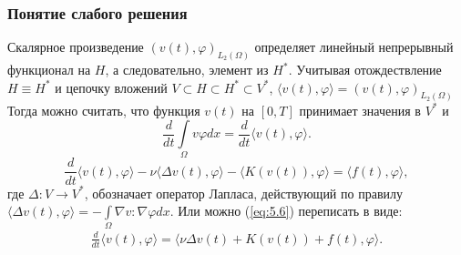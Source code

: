 \documentclass[10pt, pdf, hyperref={unicode}]{beamer}
\begin{document}
  \begin{frame}
    \frametitle{Понятие слабого решения}
    \begin{center}
      \begin{minipage}[h]{0.97\linewidth}
      Скалярное произведение $(v(t), \varphi)_{L_2(\Omega)}$ определяет линейный непрерывный функционал на $H$, а следовательно,
      элемент из $H^\ast$. Учитывая отождествление $H \equiv H^\ast$ и цепочку вложений $V \subset H \subset H^\ast \subset V^\ast$,
      $\langle v(t),\varphi \rangle = (v(t),\varphi)_{L_2(\Omega)}$
      Тогда можно считать, что функция $v(t)$ на $[0, T]$ принимает значения в $V^\ast$ и
      $$\frac{d}{dt}\int\limits_\Omega v \varphi dx=\frac{d}{dt}\langle v(t),\varphi \rangle.$$
      $$\frac{d}{dt} \langle v(t),\varphi \rangle - \nu\langle \Delta v(t), \varphi \rangle -
      \langle K(v(t)),\varphi \rangle = \langle f(t),\varphi \rangle,$$
      где $\Delta: V \rightarrow V^\ast$, обозначает оператор Лапласа, действующий по правилу
      $\langle \Delta v(t),\varphi \rangle=-\int\limits_\Omega \nabla v:\nabla\varphi dx.$
      Или можно (\ref{eq:5.6}) переписать в виде:
        \begin{equation}\label{eq:5.8}
          \begin{gathered}
            \frac{d}{dt} \langle v(t),\varphi \rangle = \langle \nu\Delta v(t)+K(v(t))+f(t),\varphi \rangle.
          \end{gathered}
        \end{equation}
      \end{minipage}
    \end{center}
  \end{frame}
\end{document}
